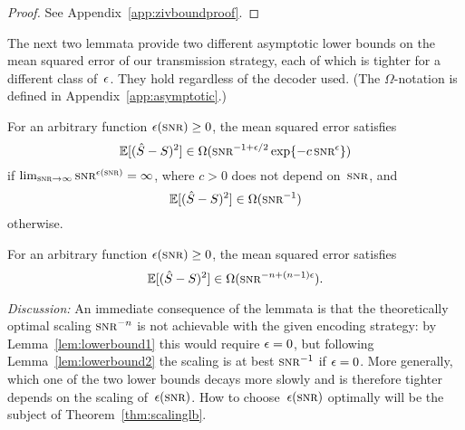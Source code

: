 \begin{proof}
  See Appendix~\ref{app:zivboundproof}.
\end{proof}

The next two lemmata provide two different asymptotic lower bounds on the
mean squared error of our transmission strategy, each of which is tighter for a
different class of~$\epsilon$. They hold regardless of the decoder used.  (The
$\Omega$-notation is defined in Appendix~\ref{app:asymptotic}.)

\begin{lemma}
  \label{lem:lowerbound2}
  For an arbitrary function $\e(\snr) \ge 0$, the mean squared error
  satisfies
  \begin{equation*}
    \mse \in \Omega(\snr^{-1+\e/2} \exp\{-c\snr^\e\})
  \end{equation*}
  if $\limtoinf{\snr} \snr^{\e(\snr)} = \infty$, where $c>0$ does not depend
  on~$\snr$, and
  \begin{equation*}
    \mse \in \Omega(\snr^{-1})
  \end{equation*}
  otherwise.
\end{lemma}

\begin{lemma}
  \label{lem:lowerbound1}
  For an arbitrary function $\e(\snr) \ge 0$, the mean squared error satisfies
  \begin{equation*}
    \mse \in \Omega(\snr^{-n + (n-1)\e}).
  \end{equation*}
\end{lemma}

\emph{Discussion:} An immediate consequence of the lemmata is that the
theoretically optimal scaling $\snr^{-n}$ is not achievable with the given
encoding strategy: by Lemma~\ref{lem:lowerbound1} this would require $\epsilon = 0$,
but following Lemma~\ref{lem:lowerbound2} the scaling is at best $\snr^{-1}$ if
$\epsilon = 0 $.  More generally, which one of the two lower bounds decays more slowly
and is therefore tighter depends on the scaling of~$\e(\snr)$. How to
choose~$\e(\snr)$ optimally will be the subject of Theorem~\ref{thm:scalinglb}.

